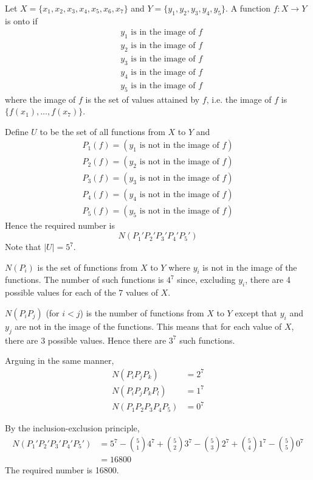 
Let $X = \{x_1, x_2, x_3, x_4, x_5, x_6, x_7\}$
and $Y = \{y_1, y_2, y_3, y_4, y_5\}$.
A function $f : X \rightarrow Y$ is onto if
\begin{align*}
& y_1 \text{ is in the image of $f$} \\
& y_2 \text{ is in the image of $f$} \\
& y_3 \text{ is in the image of $f$} \\
& y_4 \text{ is in the image of $f$} \\
& y_5 \text{ is in the image of $f$} 
\end{align*}
where the image of $f$ is the set of values attained by $f$, i.e.
the image of $f$ is $\{f(x_1), \ldots, f(x_7)\}$.

Define $U$ to be the set of all functions from $X$ to $Y$ and
\begin{align*}
P_1(f) = (y_1 \text{ is not in the image of $f$})  \\ 
P_2(f) = (y_2 \text{ is not in the image of $f$})  \\
P_3(f) = (y_3 \text{ is not in the image of $f$})  \\
P_4(f) = (y_4 \text{ is not in the image of $f$})  \\
P_5(f) = (y_5 \text{ is not in the image of $f$}) 
\end{align*}
Hence the required number is
\[
N(P_1' P_2' P_3' P_4' P_5')
\]
Note that $|U| = 5^7$.

$N(P_i)$ is the set of functions from $X$ to $Y$ where $y_i$ is
not in the image of the functions.
The number of such functions is $4^7$ since, excluding $y_i$,
there are 4 possible
values for each of the $7$ values of $X$.

$N(P_iP_j)$ (for $i < j$) 
is the number of functions from $X$ to $Y$
except that $y_i$ and $y_j$ are not in the image of the functions.
This means that for each value of $X$, there are 3 possible values.
Hence there are $3^7$ such functions.

Arguing in the same manner, 
\begin{align*}
N(P_i P_j P_k) &= 2^7 \\
N(P_i P_j P_k P_l) &= 1^7 \\
N(P_1 P_2 P_3 P_4 P_5) &= 0^7 
\end{align*}

By the inclusion-exclusion principle, 
\begin{align*}
N(P_1' P_2' P_3' P_4' P_5')
&= 5^7 
 - \binom{5}{1} 4^7
 + \binom{5}{2} 3^7
 - \binom{5}{3} 2^7
 + \binom{5}{4} 1^7
 - \binom{5}{5} 0^7 \\
&= 16800
\end{align*}
The required number is 16800.

